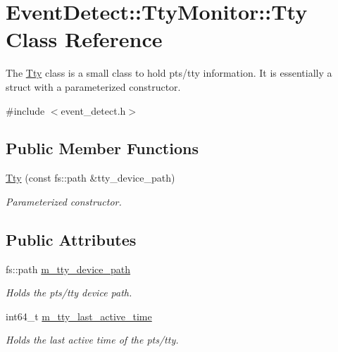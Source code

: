\hypertarget{classEventDetect_1_1TtyMonitor_1_1Tty}{}\section{Event\+Detect\+:\+:Tty\+Monitor\+:\+:Tty Class Reference}
\label{classEventDetect_1_1TtyMonitor_1_1Tty}


The \mbox{\hyperlink{classEventDetect_1_1TtyMonitor_1_1Tty}{Tty}} class is a small class to hold pts/tty information. It is essentially a struct with a parameterized constructor.  




{\ttfamily \#include $<$event\+\_\+detect.\+h$>$}

\subsection*{Public Member Functions}
\begin{DoxyCompactItemize}
\item 
\mbox{\hyperlink{classEventDetect_1_1TtyMonitor_1_1Tty_a178d55091f19e95e818db82979748a00}{Tty}} (const fs\+::path \&tty\+\_\+device\+\_\+path)
\begin{DoxyCompactList}\small\item\em Parameterized constructor. \end{DoxyCompactList}\end{DoxyCompactItemize}
\subsection*{Public Attributes}
\begin{DoxyCompactItemize}
\item 
\mbox{\label{classEventDetect_1_1TtyMonitor_1_1Tty_a9fd3a212b83352bb2658560b2ff050be}} 
fs\+::path \mbox{\hyperlink{classEventDetect_1_1TtyMonitor_1_1Tty_a9fd3a212b83352bb2658560b2ff050be}{m\+\_\+tty\+\_\+device\+\_\+path}}
\begin{DoxyCompactList}\small\item\em Holds the pts/tty device path. \end{DoxyCompactList}\item 
\mbox{\label{classEventDetect_1_1TtyMonitor_1_1Tty_a97988a40625efa1fe662ea196917e6fe}} 
int64\+\_\+t \mbox{\hyperlink{classEventDetect_1_1TtyMonitor_1_1Tty_a97988a40625efa1fe662ea196917e6fe}{m\+\_\+tty\+\_\+last\+\_\+active\+\_\+time}}
\begin{DoxyCompactList}\small\item\em Holds the last active time of the pts/tty. \end{DoxyCompactList}\end{DoxyCompactItemize}


